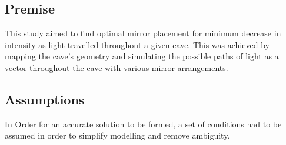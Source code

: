 \documentclass[11pt, letterpaper]{article}
\begin{document}
	
	\subsection{Premise}
	This study aimed to find optimal mirror placement for minimum decrease in intensity as light travelled throughout a given cave. This was achieved by mapping the cave's geometry and simulating the possible paths of light as a vector throughout the cave with various mirror arrangements.
	
	
	
	
	\subsection{Assumptions} 
	\par
	
	In Order for an accurate solution to be formed, a set of conditions had to be assumed in order to simplify modelling and remove ambiguity.
\end{document}
